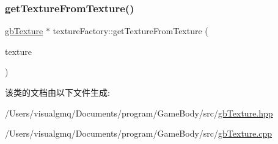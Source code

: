 \mbox{\label{classtexture_factory_ab531da926bf210ac07e6493261dd3c53}} 
\subsubsection{\texorpdfstring{getTextureFromTexture()}{getTextureFromTexture()}}
{\footnotesize\ttfamily \mbox{\hyperlink{classgb_texture}{gb\+Texture}} $\ast$ texture\+Factory\+::get\+Texture\+From\+Texture (\begin{DoxyParamCaption}\item[{S\+D\+L\+\_\+\+Texture $\ast$}]{texture }\end{DoxyParamCaption})}



该类的文档由以下文件生成\+:\begin{DoxyCompactItemize}
\item 
/\+Users/visualgmq/\+Documents/program/\+Game\+Body/src/\mbox{\hyperlink{gb_texture_8hpp}{gb\+Texture.\+hpp}}\item 
/\+Users/visualgmq/\+Documents/program/\+Game\+Body/src/\mbox{\hyperlink{gb_texture_8cpp}{gb\+Texture.\+cpp}}\end{DoxyCompactItemize}
